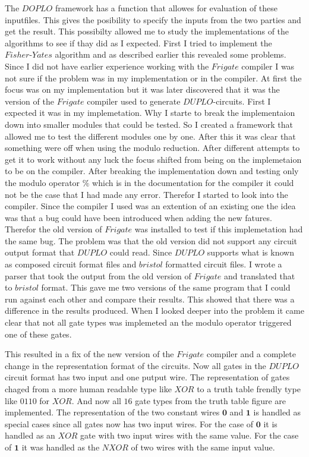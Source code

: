 The $DOPLO$ framework has a function that allowes for evaluation of these inputfiles. This gives the posibility to specify the inputs from the two parties and get the result. This possibilty allowed me to study the implementations of the algorithms to see if thay did as I expected. First I tried to implement the $Fisher\text{-}Yates$ algorithm and as described earlier this revealed some problems. Since I did not have earlier experience working with the $Frigate$ compiler I was not sure if the problem was in my implementation or in the compiler. At first the focus was on my implementation but it was later discovered that it was the version of the $Frigate$ compiler used to generate $DUPLO$-circuits. First I expected it was in my implemetation. Why I starte to break the implementaion down into smaller modules that could be tested. So I created a framework that allowed me to test the different modules one by one. After this it was clear that something were off when using the modulo reduction. After different attempts to get it to work without any luck the focus shifted from being on the implemetaion to be on the compiler. After breaking the implementation down and testing only the modulo operator $\%$ which is in the documentation for the compiler it could not be the case that I had made any error. Therefor I started to look into the compiler. Since the compiler I used was an extention of an existing one the idea was that a bug could have been introduced when adding the new fatures. Therefor the old version of $Frigate$ was installed to test if this implemetation had the same bug. The problem was that the old version did not support any circuit output format that $DUPLO$ could read. Since $DUPLO$ supports what is known as composed circuit format files and $bristol$ formatted circuit files. I wrote a parser that took the output from the old version of $Frigate$ and translated that to $bristol$ format. This gave me two versions of the same program that I could run against each other and compare their results. This showed that there was a difference in the results produced. When I looked deeper into the problem it came clear that not all gate types was implemeted an the modulo operator triggered one of these gates.

This resulted in a fix of the new version of the $Frigate$ compiler and a complete change in the representation format of the circuits. Now all gates in the $DUPLO$ circuit format has two input and one putput wire. The representation of gates chaged from a more human readable type like $XOR$ to a truth table frendly type like $0110$ for $XOR$. And now all $16$ gate types from the truth table figure are implemented. The representation of the two constant wires $\textbf{0}$ and $\textbf{1}$ is handled as special cases since all gates now has two input wires. For the case of $\textbf{0}$ it is handled as an $XOR$ gate with two input wires with the same value. For the case of $\textbf{1}$ it was handled as the $NXOR$ of two wires with the same input value.


